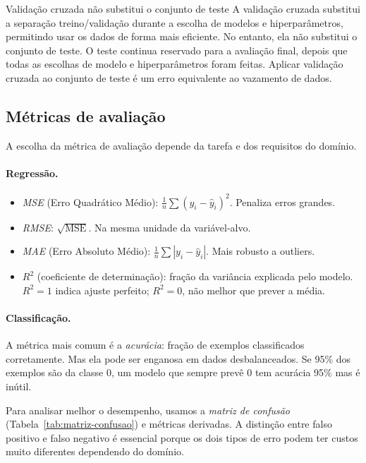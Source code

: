 \documentclass[12pt,a4paper]{article}
\begin{document}
\begin{alertabox}{Validação cruzada não substitui o conjunto de teste}
A validação cruzada substitui a separação treino/validação durante a escolha de modelos e hiperparâmetros, permitindo usar os dados de forma mais eficiente. No entanto, ela não substitui o conjunto de teste. O teste continua reservado para a avaliação final, depois que todas as escolhas de modelo e hiperparâmetros foram feitas. Aplicar validação cruzada ao conjunto de teste é um erro equivalente ao vazamento de dados.
\end{alertabox}

\subsection{Métricas de avaliação}
\label{subsec:metricas}

A escolha da métrica de avaliação depende da tarefa e dos requisitos do domínio.

\paragraph{Regressão.}
\begin{itemize}[nosep]
    \item \emph{MSE} (Erro Quadrático Médio): $\frac{1}{n}\sum (y_i - \hat{y}_i)^2$. Penaliza erros grandes.
    \item \emph{RMSE}: $\sqrt{\text{MSE}}$. Na mesma unidade da variável-alvo.
    \item \emph{MAE} (Erro Absoluto Médio): $\frac{1}{n}\sum |y_i - \hat{y}_i|$. Mais robusto a outliers.
    \item \emph{$R^2$} (coeficiente de determinação): fração da variância explicada pelo modelo. $R^2 = 1$ indica ajuste perfeito; $R^2 = 0$, não melhor que prever a média.
\end{itemize}

\paragraph{Classificação.}

A métrica mais comum é a \emph{acurácia}: fração de exemplos classificados corretamente. Mas ela pode ser enganosa em dados desbalanceados. Se 95\% dos exemplos são da classe $0$, um modelo que sempre prevê $0$ tem acurácia 95\% mas é inútil.

Para analisar melhor o desempenho, usamos a \emph{matriz de confusão} (Tabela~\ref{tab:matriz-confusao}) e métricas derivadas. A distinção entre falso positivo e falso negativo é essencial porque os dois tipos de erro podem ter custos muito diferentes dependendo do domínio.
\end{document}
